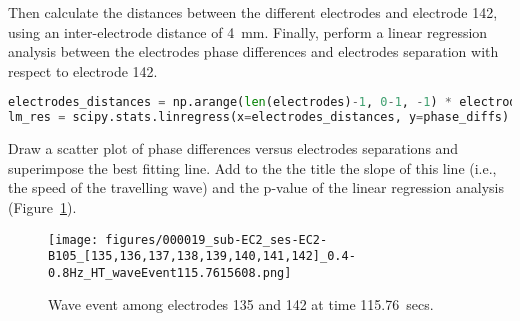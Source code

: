 \documentclass[12pt]{article}
\begin{document}
Then calculate the distances between the different electrodes and electrode 142, using an inter-electrode distance of 4~mm. Finally, perform a linear regression analysis between the electrodes phase differences and electrodes separation with respect to electrode 142.

\begin{lstlisting}[language=python]
electrodes_distances = np.arange(len(electrodes)-1, 0-1, -1) * electrodes_separation
lm_res = scipy.stats.linregress(x=electrodes_distances, y=phase_diffs)
\end{lstlisting}

Draw a scatter plot of phase differences versus electrodes separations and superimpose the best fitting line. Add to the the title the slope of this line (i.e., the speed of the travelling wave) and the p-value of the linear regression analysis (Figure~\ref{fig:waveEvent}).

\begin{figure}
    \begin{center}
        \texttt{[image: figures/000019\_sub-EC2\_ses-EC2-B105\_[135,136,137,138,139,140,141,142]\_0.4-0.8Hz\_HT\_waveEvent115.7615608.png]}
    \end{center}
    \caption{Wave event among electrodes 135 and 142 at time 115.76~secs.}
    \label{fig:waveEvent}
\end{figure}

% 


\end{document}
